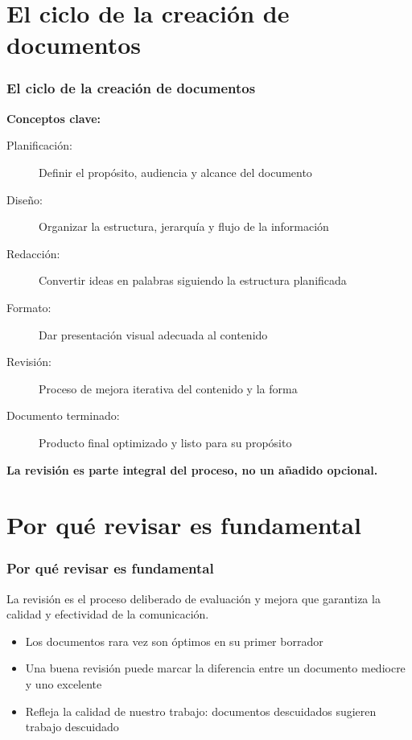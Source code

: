 \documentclass{beamer}
\begin{document}



\frame{\titlepage}


\section{El ciclo de la creación de documentos}
\begin{frame}
\frametitle{El ciclo de la creación de documentos}

\textbf{Conceptos clave:}
\begin{description}
\item[Planificación:] Definir el propósito, audiencia y alcance del documento
\item[Diseño:] Organizar la estructura, jerarquía y flujo de la información
\item[Redacción:] Convertir ideas en palabras siguiendo la estructura planificada
\item[Formato:] Dar presentación visual adecuada al contenido
\item[Revisión:] Proceso de mejora iterativa del contenido y la forma
\item[Documento terminado:] Producto final optimizado y listo para su propósito
\end{description}

\vspace{0.5cm}
\textbf{La revisión es parte integral del proceso, no un añadido opcional.}
\end{frame}


\section{Por qué revisar es fundamental}
\begin{frame}
\frametitle{Por qué revisar es fundamental}

\textbf{} La revisión es el proceso deliberado de evaluación y mejora que garantiza la calidad y efectividad de la comunicación.

\vspace{0.5cm}
\begin{itemize}
\item Los documentos rara vez son óptimos en su primer borrador
\item Una buena revisión puede marcar la diferencia entre un documento mediocre y uno excelente
\item Refleja la calidad de nuestro trabajo: documentos descuidados sugieren trabajo descuidado
\end{itemize}
\end{frame}
\end{document}
